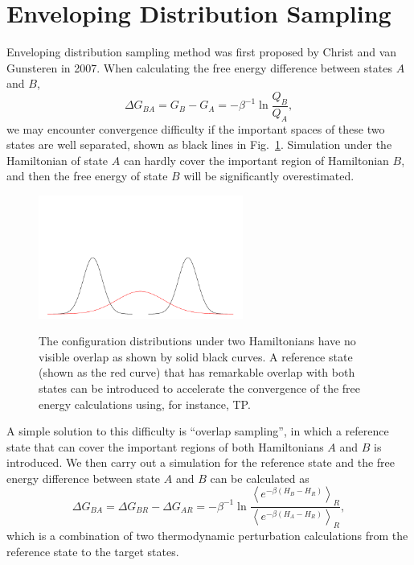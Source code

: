 \section{Enveloping Distribution Sampling\label{Sec:ES:EDS}}
Enveloping distribution sampling method was first proposed by Christ and van Gunsteren in 2007.\cite{ChristJCP2007}
When calculating the free energy difference between states $A$ and $B$,
\begin{equation}
	\Delta G_{BA}=G_B-G_A=-\beta^{-1}\ln{\frac{Q_B}{Q_A}},
\end{equation}
we may encounter convergence difficulty if the important spaces of these two states are well separated, shown as black lines in Fig.~\ref{Fig:ES:triple_gaussian}.
Simulation under the Hamiltonian of state $A$ can hardly cover the important region of Hamiltonian $B$, and then the free energy of state $B$ will be significantly overestimated.
\begin{figure}[htbp]
	\centering
	\includegraphics[width=0.6\textwidth]{figures/triple_gaussian.pdf}\\
	\caption{The configuration distributions under two Hamiltonians have no visible overlap as shown by solid black curves. A reference state (shown as the red curve) that has remarkable overlap with both states can be introduced to accelerate the convergence of the free energy calculations using, for instance, TP.}\label{Fig:ES:triple_gaussian}
\end{figure}
A simple solution to this difficulty is ``overlap sampling'', in which a reference state that can cover the important regions of both Hamiltonians $A$ and $B$ is introduced.
We then carry out a simulation for the reference state and the free energy difference between state $A$ and $B$ can be calculated as
\begin{equation}
	\Delta G_{BA}=\Delta G_{BR}-\Delta G_{AR}=-\beta^{-1}\ln{\frac{\left<e^{-\beta\left(H_B-H_R\right)}\right>_R}{\left<e^{-\beta\left(H_A-H_R\right)}\right>_R}},
\end{equation} 
which is a combination of two thermodynamic perturbation calculations from the reference state to the target states.


